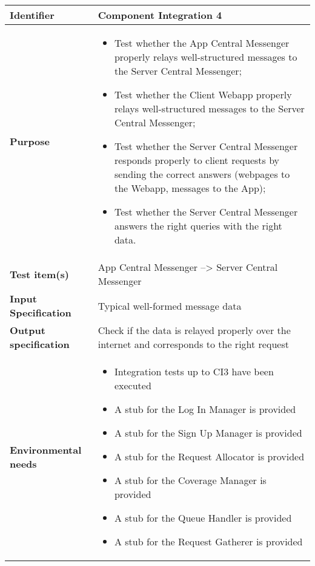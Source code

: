 \begin{center}
\begin{tabular}{lp{}}
\toprule
\textbf{Identifier}		&	Component Integration 4\\
\midrule
\textbf{Purpose}		&	\begin{itemize}
					\item Test whether the App Central Messenger properly relays well-structured messages to the Server Central Messenger;
					\item Test whether the Client Webapp properly relays well-structured messages to the Server Central Messenger;
					\item Test whether the Server Central Messenger responds properly to client requests by sending the correct answers (webpages to the Webapp, messages to the App);
					\item Test whether the Server Central Messenger answers the right queries with the right data.
					\end{itemize}	\\
\textbf{Test item(s)}	&	App Central Messenger --> Server Central Messenger\\

\textbf{Input Specification}	&	Typical well-formed message data\\
\textbf{Output specification}	&	Check if the data is relayed properly over the internet and corresponds to the right request\\
\textbf{Environmental needs}	&	\begin{itemize}
							\item Integration tests up to CI3 have been executed
							\item A stub for the Log In Manager is provided
							\item A stub for the Sign Up Manager is provided											\item A stub for the Request Allocator is provided
							\item A stub for the Coverage Manager is provided
							\item A stub for the Queue Handler is provided
							\item A stub for the Request Gatherer is provided
							\end{itemize}	\\
\bottomrule
\end{tabular}
\end{center}



